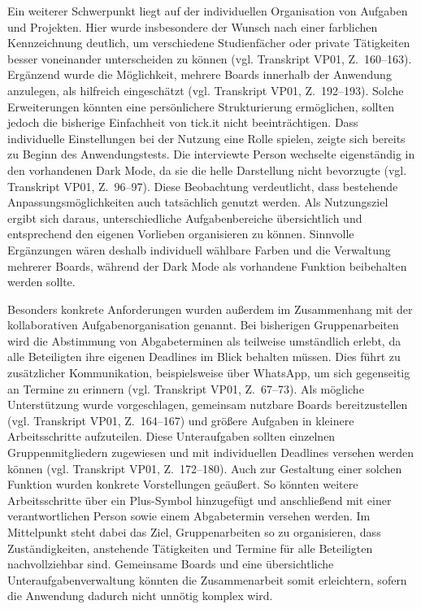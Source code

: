 Ein weiterer Schwerpunkt liegt auf der individuellen Organisation von Aufgaben und Projekten.
Hier wurde insbesondere der Wunsch nach einer farblichen Kennzeichnung deutlich, um verschiedene Studienfächer oder private Tätigkeiten besser voneinander unterscheiden zu können (vgl. Transkript VP01, Z.~160–163).
Ergänzend wurde die Möglichkeit, mehrere Boards innerhalb der Anwendung anzulegen, als hilfreich eingeschätzt (vgl. Transkript VP01, Z.~192–193).
Solche Erweiterungen könnten eine persönlichere Strukturierung ermöglichen, sollten jedoch die bisherige Einfachheit von tick.it nicht beeinträchtigen.
Dass individuelle Einstellungen bei der Nutzung eine Rolle spielen, zeigte sich bereits zu Beginn des Anwendungstests.
Die interviewte Person wechselte eigenständig in den vorhandenen Dark Mode, da sie die helle Darstellung nicht bevorzugte (vgl. Transkript VP01, Z.~96–97).
Diese Beobachtung verdeutlicht, dass bestehende Anpassungsmöglichkeiten auch tatsächlich genutzt werden.
Als Nutzungsziel ergibt sich daraus, unterschiedliche Aufgabenbereiche übersichtlich und entsprechend den eigenen Vorlieben organisieren zu können.
Sinnvolle Ergänzungen wären deshalb individuell wählbare Farben und die Verwaltung mehrerer Boards, während der Dark Mode als vorhandene Funktion beibehalten werden sollte.

Besonders konkrete Anforderungen wurden außerdem im Zusammenhang mit der kollaborativen Aufgabenorganisation genannt.
Bei bisherigen Gruppenarbeiten wird die Abstimmung von Abgabeterminen als teilweise umständlich erlebt, da alle Beteiligten ihre eigenen Deadlines im Blick behalten müssen.
Dies führt zu zusätzlicher Kommunikation, beispielsweise über WhatsApp, um sich gegenseitig an Termine zu erinnern (vgl. Transkript VP01, Z.~67–73).
Als mögliche Unterstützung wurde vorgeschlagen, gemeinsam nutzbare Boards bereitzustellen (vgl. Transkript VP01, Z.~164–167) und größere Aufgaben in kleinere Arbeitsschritte aufzuteilen.
Diese Unteraufgaben sollten einzelnen Gruppenmitgliedern zugewiesen und mit individuellen Deadlines versehen werden können (vgl. Transkript VP01, Z.~172–180).
Auch zur Gestaltung einer solchen Funktion wurden konkrete Vorstellungen geäußert.
So könnten weitere Arbeitsschritte über ein Plus-Symbol hinzugefügt und anschließend mit einer verantwortlichen Person sowie einem Abgabetermin versehen werden.
Im Mittelpunkt steht dabei das Ziel, Gruppenarbeiten so zu organisieren, dass Zuständigkeiten, anstehende Tätigkeiten und Termine für alle Beteiligten nachvollziehbar sind.
Gemeinsame Boards und eine übersichtliche Unteraufgabenverwaltung könnten die Zusammenarbeit somit erleichtern, sofern die Anwendung dadurch nicht unnötig komplex wird.

